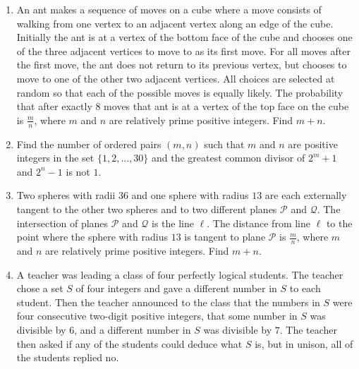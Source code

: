 \documentclass{article}
\begin{document}
\begin{enumerate}[label=\arabic*., itemsep=0.5em]
\begin{equation*}
a + b &= -3, \\
ab + bc + ca &= -4, \\
abc + bcd + cda + dab &= 14, \\
abcd &= 30.
\end{equation*}

There exist relatively prime positive integers $m$ and $n$ such that

\begin{equation*}
a^2 + b^2 + c^2 + d^2 = \frac{m}{n}.
\end{equation*}
Find $m + n$.\par \vspace{0.5em}\item An ant makes a sequence of moves on a cube where a move consists of walking from one vertex to an adjacent vertex along an edge of the cube. Initially the ant is at a vertex of the bottom face of the cube and chooses one of the three adjacent vertices to move to as its first move. For all moves after the first move, the ant does not return to its previous vertex, but chooses to move to one of the other two adjacent vertices. All choices are selected at random so that each of the possible moves is equally likely. The probability that after exactly $8$ moves that ant is at a vertex of the top face on the cube is $\frac{m}{n}$, where $m$ and $n$ are relatively prime positive integers. Find $m + n.$\par \vspace{0.5em}\item Find the number of ordered pairs $(m, n)$ such that $m$ and $n$ are positive integers in the set $\{1, 2, ..., 30\}$ and the greatest common divisor of $2^m + 1$ and $2^n - 1$ is not $1$.\par \vspace{0.5em}\item Two spheres with radii $36$ and one sphere with radius $13$ are each externally tangent to the other two spheres and to two different planes $\mathcal{P}$ and $\mathcal{Q}$. The intersection of planes $\mathcal{P}$ and $\mathcal{Q}$ is the line $\ell$. The distance from line $\ell$ to the point where the sphere with radius $13$ is tangent to plane $\mathcal{P}$ is $\tfrac{m}{n}$, where $m$ and $n$ are relatively prime positive integers. Find $m + n$.\par \vspace{0.5em}\item A teacher was leading a class of four perfectly logical students. The teacher chose a set $S$ of four integers and gave a different number in $S$ to each student. Then the teacher announced to the class that the numbers in $S$ were four consecutive two-digit positive integers, that some number in $S$ was divisible by $6$, and a different number in $S$ was divisible by $7$. The teacher then asked if any of the students could deduce what $S$ is, but in unison, all of the students replied no.


\end{enumerate}
\end{document}

